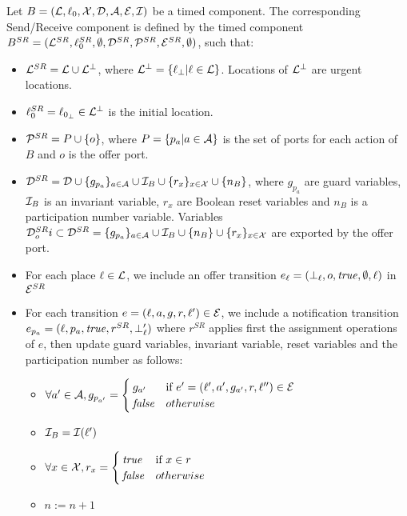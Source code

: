 \begin{definition}\label{def:tcSR}
Let $B=(\mathcal{L},\ell_{0},\mathcal{X},\mathcal{D},\mathcal{A},\mathcal{E},\mathcal{I})$ be a timed component. The 
  corresponding Send/Receive component is defined by the timed component
  $B^{SR}=(\mathcal{L}^{SR},\ell_0^{SR},\emptyset,\mathcal{D}^{SR},
  \mathcal{P}^{SR},\mathcal{E}^{SR},\emptyset)$, such that:
  \begin{itemize}
    \item $\mathcal{L}^{SR}=\mathcal{L}\cup\mathcal{L}^{\perp}$, where $\mathcal{L}^{\perp}=\{\ell_{\perp}|\ell\in\mathcal{L}\}$.
      Locations of $\mathcal{L}^{\perp}$ are urgent locations.
    \item $\ell_0^{SR}=\ell_{0_{\perp}}\in\mathcal{L}^{\perp}$ is the initial location.
    \item $\mathcal{P}^{SR}= P\cup\{o\}$, where $P=\{p_a|a\in\mathcal{A}\}$ is the set of ports for each
      action of $B$ and $o$ is the offer port. 
    \item $\mathcal{D}^{SR}=\mathcal{D}\cup\{g_{p_a}\}_{a\in\mathcal{A}}\cup\mathcal{I}_{B}\cup\{r_x\}_{x\in\mathcal{X}}
      \cup\{n_B\}$,
      where $g_{p_a}$ are guard variables, $\mathcal{I}_{B}$ is an invariant variable, $r_x$ are 
      Boolean reset variables and $n_B$ is a participation number variable.
      Variables $\mathcal{D}_o^{SR}i\subset\mathcal{D}^{SR}=\{g_{p_a}\}_{a\in\mathcal{A}}\cup\mathcal{I}_{B}\cup
      \{n_B\}\cup\{r_x\}_{x\in\mathcal{X}}$  are exported by the offer port.
    \item For each place $\ell\in\mathcal{L}$, we include an offer transition $e_{\ell}=(\perp_{\ell},o,\textnormal{\textit{true}},
      \emptyset,\ell)$ in $\mathcal{E}^{SR}$
    \item For each transition $e=(\ell,a,g,r,\ell')\in\mathcal{E}$, we include a notification 
      transition $e_{p_a}=(\ell,p_a,\textnormal{\textit{true}},r^{SR},\perp_{\ell}')$ where $r^{SR}$ applies first 
      the assignment operations of $e$, then update guard variables, invariant variable,
      reset variables and the participation number as follows:
      \begin{itemize}
        \item $\forall a'\in\mathcal{A}, g_{p_{a'}}=\begin{cases}
            g_{a'} & \text{if } e'=(\ell',a',g_{a'},r,\ell'')\in\mathcal{E}\\
          \textnormal{\textit{false}} & otherwise
        \end{cases}$
        \item $\mathcal{I}_B=\mathcal{I}(\ell')$
        \item $\forall x\in\mathcal{X}, r_x=\begin{cases}
            \textnormal{\textit{true}} & \text{if } x\in r\\
          \textnormal{\textit{false}} & otherwise
        \end{cases}$
        \item $n:=n+1$
      \end{itemize}
  \end{itemize}
\end{definition}

